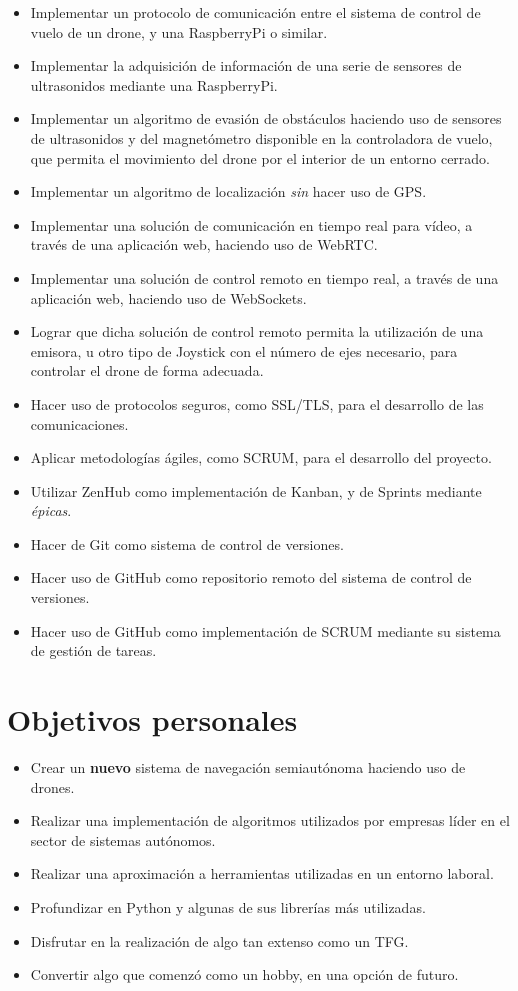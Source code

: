 \begin{itemize}
\item Implementar un protocolo de comunicación entre el sistema de control de vuelo de un drone, y una RaspberryPi o similar.
\item Implementar la adquisición de información de una serie de sensores de ultrasonidos mediante una RaspberryPi.
\item Implementar un algoritmo de evasión de obstáculos haciendo uso de sensores de ultrasonidos y del magnetómetro disponible en la controladora de vuelo, que permita el movimiento del drone por el interior de un entorno cerrado. 
\item Implementar un algoritmo de localización \emph{sin} hacer uso de GPS.
\item Implementar una solución de comunicación en tiempo real para vídeo, a través de una aplicación web, haciendo uso de WebRTC.
\item Implementar una solución de control remoto en tiempo real, a través de una aplicación web, haciendo uso de WebSockets.
\item Lograr que dicha solución de control remoto permita la utilización de una emisora, u otro tipo de Joystick con el número de ejes necesario, para controlar el drone de forma adecuada.
\item Hacer uso de protocolos seguros, como SSL/TLS, para el desarrollo de las comunicaciones.  
\item Aplicar metodologías ágiles, como SCRUM, para el desarrollo del proyecto.
\item Utilizar ZenHub como implementación de Kanban, y de Sprints mediante \textit{épicas}.
\item Hacer de Git como sistema de control de versiones.
\item Hacer uso de GitHub como repositorio remoto del sistema de control de versiones.
\item Hacer uso de GitHub como implementación de SCRUM mediante su sistema de gestión de tareas.
\end{itemize}


\section{Objetivos personales}

\begin{itemize}
\item Crear un \textbf{nuevo} sistema de navegación semiautónoma haciendo uso de drones.
\item Realizar una implementación de algoritmos utilizados por empresas líder en el sector de sistemas autónomos.
\item Realizar una aproximación a herramientas utilizadas en un entorno laboral.
\item Profundizar en Python y algunas de sus librerías más utilizadas.
\item Disfrutar en la realización de algo tan extenso como un TFG.
\item Convertir algo que comenzó como un hobby, en una opción de futuro.
\end{itemize}